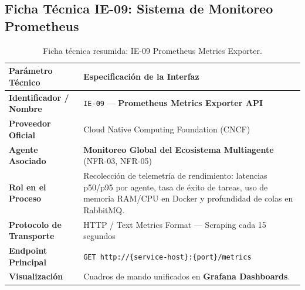 \documentclass[11pt,a4paper]{article}
\begin{document}
\subsection{Ficha Técnica IE-09: Sistema de Monitoreo Prometheus}\label{sec:ie09}
\begin{table}[h!]
\centering
\small
\begin{tabular}{p{4.5cm} p{11cm}}
\toprule
\textbf{Parámetro Técnico} & \textbf{Especificación de la Interfaz} \\
\midrule
\textbf{Identificador / Nombre} & \texttt{IE-09} --- \textbf{Prometheus Metrics Exporter API} \\
\textbf{Proveedor Oficial} & Cloud Native Computing Foundation (CNCF) \\
\textbf{Agente Asociado} & \textbf{Monitoreo Global del Ecosistema Multiagente} (NFR-03, NFR-05) \\
\textbf{Rol en el Proceso} & Recolección de telemetría de rendimiento: latencias p50/p95 por agente, tasa de éxito de tareas, uso de memoria RAM/CPU en Docker y profundidad de colas en RabbitMQ. \\
\textbf{Protocolo de Transporte} & HTTP / Text Metrics Format --- Scraping cada 15 segundos \\
\textbf{Endpoint Principal} & \texttt{GET http://\{service-host\}:\{port\}/metrics} \\
\textbf{Visualización} & Cuadros de mando unificados en \textbf{Grafana Dashboards}. \\
\bottomrule
\end{tabular}
\caption{Ficha técnica resumida: IE-09 Prometheus Metrics Exporter.}
\end{table}
\end{document}
